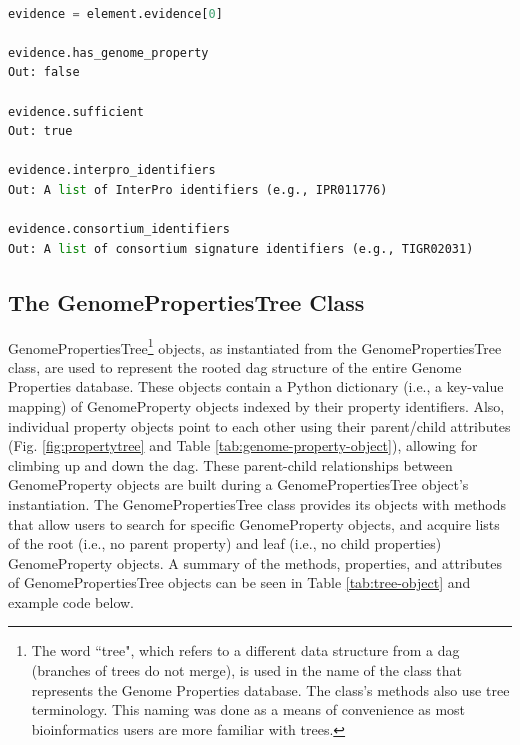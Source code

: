 \begin{lstlisting}[language=Python]

evidence = element.evidence[0]
	
evidence.has_genome_property
Out: false

evidence.sufficient
Out: true

evidence.interpro_identifiers
Out: A list of InterPro identifiers (e.g., IPR011776)

evidence.consortium_identifiers 
Out: A list of consortium signature identifiers (e.g., TIGR02031)

\end{lstlisting}

\subsection{The GenomePropertiesTree Class} \label{GenomePropertiesTree-Class}

GenomePropertiesTree\footnote{The word ``tree", which refers to a different data structure from a \gls{dag} (branches of trees do not merge), is used in the name of the class that represents the Genome Properties database. The class's methods also use tree terminology. This naming was done as a means of convenience as most bioinformatics users are more familiar with trees.}  objects, as instantiated from the GenomePropertiesTree class, are used to represent the rooted \gls{dag} structure of the entire Genome Properties database.  These objects contain a Python dictionary (i.e., a key-value mapping) of GenomeProperty objects indexed by their property identifiers. Also, individual property objects point to each other using their parent/child attributes (Fig. \ref{fig:propertytree} and Table \ref{tab:genome-property-object}), allowing for climbing up and down the \gls{dag}. These parent-child relationships between GenomeProperty objects are built during a GenomePropertiesTree object's instantiation. The GenomePropertiesTree class provides its objects with methods that allow users to search for specific GenomeProperty objects, and acquire lists of the root (i.e., no parent property) and leaf (i.e., no child properties) GenomeProperty objects. A summary of the methods, properties, and attributes of GenomePropertiesTree objects can be seen in Table \ref{tab:tree-object} and example code below.

